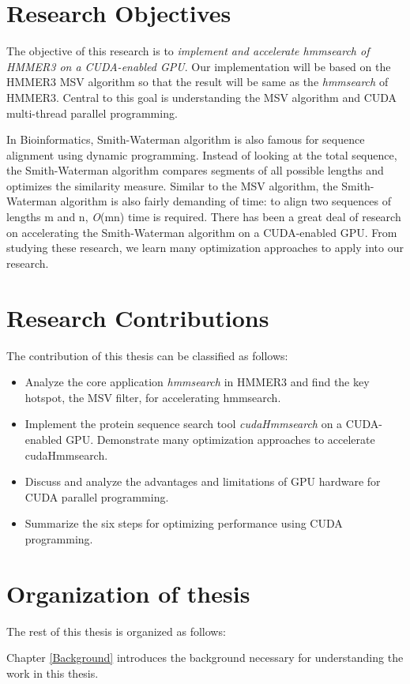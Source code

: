 \section{Research Objectives}
The objective of this research is to \emph{implement and accelerate hmmsearch of HMMER3 on a CUDA-enabled GPU}. Our implementation will be based on the HMMER3 MSV algorithm so that the result will be same as the \emph{hmmsearch} of HMMER3. Central to this goal is understanding the MSV algorithm and CUDA multi-thread parallel programming. 

In Bioinformatics, Smith-Waterman algorithm is also famous for sequence alignment using dynamic programming. Instead of looking at the total sequence, the Smith-Waterman algorithm compares segments of all possible lengths and optimizes the similarity measure. Similar to the MSV algorithm, the Smith-Waterman algorithm is also fairly demanding of time: to align two sequences of lengths m and n, \emph{O}(mn) time is required. There has been a great deal of research on accelerating the Smith-Waterman algorithm on a CUDA-enabled GPU. From studying these research, we learn many optimization approaches to apply into our research.

\section{Research Contributions}
The contribution of this thesis can be classified as follows:
\begin{itemize}
 \item Analyze the core application \emph{hmmsearch} in HMMER3 and find the key hotspot, the MSV filter, for accelerating hmmsearch.
 \item Implement the protein sequence search tool \emph{cudaHmmsearch} on a CUDA-enabled GPU. Demonstrate many optimization approaches to accelerate cudaHmmsearch.
 \item Discuss and analyze the advantages and limitations of GPU hardware for CUDA parallel programming.
 \item Summarize the six steps for optimizing performance using CUDA programming.
\end{itemize}

\section{Organization of thesis}
The rest of this thesis is organized as follows:

Chapter \ref{Background} introduces the background necessary for understanding the work in this thesis.

